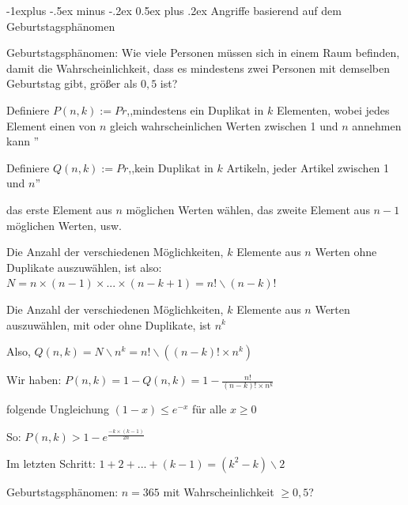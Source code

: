\documentclass[a4paper]{article}
\makeatletter
\renewcommand{\subsection}{\@startsection{subsection}{2}{0mm}%
 {-1explus -.5ex minus -.2ex}%
 {0.5ex plus .2ex}%
 {\normalfont\normalsize\bfseries}}
\makeatother
\begin{document}
\begin{multicols}{3}
      \subsection{Angriffe basierend auf dem Geburtstagsphänomen}
      \begin{itemize*}
            \item Geburtstagsphänomen: Wie viele Personen müssen sich in einem Raum befinden, damit die Wahrscheinlichkeit, dass es mindestens zwei Personen mit demselben Geburtstag gibt, größer als $0,5$ ist?
            \item Definiere $P(n,k):= Pr$,,mindestens ein Duplikat in $k$ Elementen, wobei jedes Element einen von $n$ gleich wahrscheinlichen Werten zwischen 1 und $n$ annehmen kann ''
            \item Definiere $Q(n,k):= Pr$,,kein Duplikat in $k$ Artikeln, jeder Artikel zwischen 1 und $n$''
            \begin{itemize*}
                  \item das erste Element aus $n$ möglichen Werten wählen, das zweite Element aus $n-1$ möglichen Werten, usw.
                  \item Die Anzahl der verschiedenen Möglichkeiten, $k$ Elemente aus $n$ Werten ohne Duplikate auszuwählen, ist also: $N=n \times (n-1)\times ...\times (n-k+1)= n!\backslash(n-k)!$
                  \item Die Anzahl der verschiedenen Möglichkeiten, $k$ Elemente aus $n$ Werten auszuwählen, mit oder ohne Duplikate, ist $n^k$
                  \item Also, $Q(n,k)=N\backslash n^k=n!\backslash((n-k)! \times n^k)$
            \end{itemize*}
            \item Wir haben: $P(n,k)=1-Q(n,k)=1-\frac{n!}{(n-k)!\times n^k}$ %
            \item folgende Ungleichung $(1-x) \leq e^{-x}$ für alle $x \geq 0$
            \item So: $P(n,k)>1-e^{\frac{-k\times(k-1)}{2n}}$ %
            \item Im letzten Schritt: $1+2+...+(k-1)=(k^2 - k)\backslash 2$
            \item Geburtstagsphänomen: $n=365$ mit Wahrscheinlichkeit $\geq 0,5$?
            \begin{itemize*}

\end{itemize*}
\end{itemize*}
\end{multicols}
\end{document}
